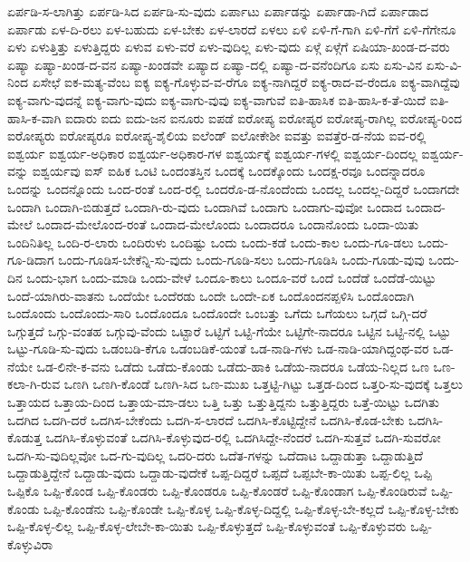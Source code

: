 {ಏರ್ಪಡಿ-ಸ-ಲಾಗಿತ್ತು
ಏರ್ಪಡಿ-ಸಿದ
ಏರ್ಪಡಿ-ಸು-ವುದು
ಏರ್ಪಾಟು
ಏರ್ಪಾಡನ್ನು
ಏರ್ಪಾಡಾ-ಗಿದೆ
ಏರ್ಪಾಡಾದ
ಏರ್ಪಾಡು
ಏಳ-ದಿ-ರಲು
ಏಳ-ಬಹುದು
ಏಳ-ಬೇಕು
ಏಳ-ಲಾರದೆ
ಏಳಲು
ಏಳಿ
ಏಳಿ-ಗೆ-ಗಾಗಿ
ಏಳಿ-ಗೆಗೆ
ಏಳಿ-ಗೆಗೇನೂ
ಏಳು
ಏಳುತ್ತಿತ್ತು
ಏಳುತ್ತಿದ್ದರು
ಏಳುವ
ಏಳು-ವರೆ
ಏಳು-ವುದಿಲ್ಲ
ಏಳು-ವುದು
ಏಳ್ಗೆ
ಏಳ್ಗೆಗೆ
ಏಷಿಯಾ-ಖಂಡ-ದ-ವರು
ಏಷ್ಯಾ
ಏಷ್ಯಾ-ಖಂಡ-ದ-ವನ
ಏಷ್ಯಾ-ಖಂಡವೇ
ಏಷ್ಯಾದ
ಏಷ್ಯಾ-ದಲ್ಲಿ
ಏಷ್ಯಾ-ದ-ವನೆಂದಿಗೂ
ಏಸು
ಏಸು-ವಿನ
ಏಸು-ವಿ-ನಿಂದ
ಏಸೇಛೆ
ಐಕ-ಮತ್ಯ-ವೆಂಬ
ಐಕ್ಯ
ಐಕ್ಯ-ಗೊಳ್ಳುವ-ವ-ರೆಗೂ
ಐಕ್ಯ-ನಾಗಿದ್ದರೆ
ಐಕ್ಯ-ರಾದ-ವ-ರೆಂದೂ
ಐಕ್ಯ-ವಾಗಿದ್ದೆವು
ಐಕ್ಯ-ವಾಗು-ವುದನ್ನೆ
ಐಕ್ಯ-ವಾಗು-ವುದು
ಐಕ್ಯ-ವಾಗು-ವುವು
ಐಕ್ಯ-ವಾಗುವೆ
ಐತಿ-ಹಾಸಿಕ
ಐತಿ-ಹಾಸಿ-ಕ-ತೆ-ಯಿದೆ
ಐತಿ-ಹಾಸಿ-ಕ-ವಾಗಿ
ಐದಾರು
ಐದು
ಐದು-ಜನ
ಐನೂರು
ಐಪಡೆ
ಐರೋಪ್ಯ
ಐರೋಪ್ಯರ
ಐರೋಪ್ಯ-ರಾಗಿಲ್ಲ
ಐರೋಪ್ಯ-ರಿಂದ
ಐರೋಪ್ಯರು
ಐರೋಪ್ಯರೂ
ಐರೋಪ್ಯ-ಶೈಲಿಯ
ಐಲೆಂಡ್
ಐಲೋಕೇಶೀ
ಐವತ್ತು
ಐವತ್ತೆರ-ಡ-ನೆಯ
ಐವ-ರಲ್ಲಿ
ಐಶ್ವರ್ಯ
ಐಶ್ವರ್ಯ-ಅಧಿಕಾರ
ಐಶ್ವರ್ಯ-ಅಧಿಕಾರ-ಗಳ
ಐಶ್ವರ್ಯಕ್ಕೆ
ಐಶ್ವರ್ಯ-ಗಳಲ್ಲಿ
ಐಶ್ವರ್ಯ-ದಿಂದಲ್ಲ
ಐಶ್ವರ್ಯ-ವನ್ನು
ಐಶ್ವರ್ಯವು
ಐಸ್
ಐಹಿಕ
ಒಂಟಿ
ಒಂದಂತಸ್ತಿನ
ಒಂದಕ್ಕೆ
ಒಂದಕ್ಕೊಂದು
ಒಂದಕ್ಷ-ರವೂ
ಒಂದನ್ನಾದರೂ
ಒಂದನ್ನು
ಒಂದನ್ನೊಂದು
ಒಂದ-ರಂತೆ
ಒಂದ-ರಲ್ಲಿ
ಒಂದರೊ-ಡ-ನೊಂದೆಂದು
ಒಂದಲ್ಲ
ಒಂದಲ್ಲ-ದಿದ್ದರೆ
ಒಂದಾಗದೇ
ಒಂದಾಗಿ
ಒಂದಾಗಿ-ಬಿಡುತ್ತದೆ
ಒಂದಾಗಿ-ರು-ವುದು
ಒಂದಾಗಿವೆ
ಒಂದಾಗು
ಒಂದಾಗು-ವುವೋ
ಒಂದಾದ
ಒಂದಾದ-ಮೇಲೆ
ಒಂದಾದ-ಮೇಲೊಂದ-ರಂತೆ
ಒಂದಾದ-ಮೇಲೊಂದು
ಒಂದಾದರೂ
ಒಂದಾನೊಂದು
ಒಂದಾ-ಯಿತು
ಒಂದಿನಿತಿಲ್ಲ
ಒಂದಿ-ರ-ಲಾರು
ಒಂದಿರುಳು
ಒಂದಿಷ್ಟು
ಒಂದು
ಒಂದು-ಕಡೆ
ಒಂದು-ಕಾಲ
ಒಂದು-ಗೂ-ಡಲು
ಒಂದು-ಗೂ-ಡಿದಾಗ
ಒಂದು-ಗೂಡಿಸ-ಬೇಕೆನ್ನಿ-ಸು-ವುದು
ಒಂದು-ಗೂಡಿ-ಸಲು
ಒಂದು-ಗೂಡಿಸಿ
ಒಂದು-ಗೂಡು-ವುವು
ಒಂದು-ದಿನ
ಒಂದು-ಭಾಗ
ಒಂದು-ಮಾಡಿ
ಒಂದು-ವೇಳೆ
ಒಂದೂ-ಕಾಲು
ಒಂದೂ-ವರೆ
ಒಂದೆ
ಒಂದೆಡೆ
ಒಂದೆಡೆ-ಯಿಟ್ಟು
ಒಂದೆ-ಯಾಗಿರು-ವಾತನು
ಒಂದೆಯೇ
ಒಂದೆರಡು
ಒಂದೇ
ಒಂದೇ-ಏಕ
ಒಂದೊಂದನಪ್ಪಳಿಸಿ
ಒಂದೊಂದಾಗಿ
ಒಂದೊಂದು
ಒಂದೊಂದು-ಸಾರಿ
ಒಂದೊಂದೂ
ಒಂದೊಂದೇ
ಒಂಬತ್ತು
ಒಗೆದು
ಒಗೆಯಲು
ಒಗ್ಗದೆ
ಒಗ್ಗಿ-ದರೆ
ಒಗ್ಗುತ್ತದೆ
ಒಗ್ಗು-ವಂತಹ
ಒಗ್ಗುವು-ವೆಂದು
ಒಟ್ಟಾರೆ
ಒಟ್ಟಿಗೆ
ಒಟ್ಟಿ-ಗೆಯೇ
ಒಟ್ಟಿಗೇ-ನಾದರೂ
ಒಟ್ಟಿನ
ಒಟ್ಟಿ-ನಲ್ಲಿ
ಒಟ್ಟು
ಒಟ್ಟು-ಗೂಡಿ-ಸು-ವುದು
ಒಡಂಬಡಿ-ಕೆಗೂ
ಒಡಂಬಡಿಕೆ-ಯಂತೆ
ಒಡ-ನಾಡಿ-ಗಳು
ಒಡ-ನಾಡಿ-ಯಾಗಿದ್ದಂಥ-ವರ
ಒಡ-ನೆಯೇ
ಒಡ-ಲಿನೇ-ಕ-ವನು
ಒಡೆದು
ಒಡೆದು-ಕೊಂಡು
ಒಡೆದು-ಹಾಕಿ
ಒಡೆಯ-ನಾದರೂ
ಒಡೆಯ-ನಿಲ್ಲದ
ಒಣ
ಒಣ-ಕಲಾ-ಗಿ-ರುವ
ಒಣಗಿ
ಒಣಗಿ-ಕೊಂಡೆ
ಒಣಗಿ-ಸಿದ
ಒಣ-ಮುಖ
ಒತ್ತಟ್ಟಿ-ಗಿಟ್ಟು
ಒತ್ತಡ-ದಿಂದ
ಒತ್ತರಿ-ಸು-ವುದಕ್ಕೆ
ಒತ್ತಲು
ಒತ್ತಾಯದ
ಒತ್ತಾಯ-ದಿಂದ
ಒತ್ತಾಯ-ಮಾ-ಡಲು
ಒತ್ತಿ
ಒತ್ತು
ಒತ್ತುತ್ತಿದ್ದನು
ಒತ್ತುತ್ತಿದ್ದರು
ಒತ್ತೆ-ಯಿಟ್ಟು
ಒದಗಿತು
ಒದಗಿದ
ಒದಗಿ-ದರೆ
ಒದಗಿಸ-ಬೇಕೆಂದು
ಒದಗಿ-ಸ-ಲಾರದೆ
ಒದಗಿಸಿ-ಕೊಟ್ಟಿದ್ದೇನೆ
ಒದಗಿಸಿ-ಕೊಡ-ಬೇಕು
ಒದಗಿಸಿ-ಕೊಡುತ್ತ
ಒದಗಿಸಿ-ಕೊಳ್ಳುವಂತೆ
ಒದಗಿಸಿ-ಕೊಳ್ಳುವುದ-ರಲ್ಲಿ
ಒದಗಿಸಿದ್ದೇ-ನೆಂದರೆ
ಒದಗಿ-ಸುತ್ತವೆ
ಒದಗಿ-ಸುವರೋ
ಒದಗಿ-ಸು-ವುದಿಲ್ಲವೋ
ಒದ-ಗು-ವುದಿಲ್ಲ
ಒದರಿ-ದರು
ಒದೆತ-ಗಳನ್ನು
ಒದೆದಾಟ
ಒದ್ದಾಡುತ್ತಾ
ಒದ್ದಾಡುತ್ತಿದೆ
ಒದ್ದಾಡುತ್ತಿದ್ದೇನೆ
ಒದ್ದಾಡು-ವುದು
ಒದ್ದಾಡು-ವುದೇಕೆ
ಒಪ್ಪ-ದಿದ್ದರೆ
ಒಪ್ಪದೆ
ಒಪ್ಪಬೇ-ಕಾ-ಯಿತು
ಒಪ್ಪ-ಲಿಲ್ಲ
ಒಪ್ಪಿ
ಒಪ್ಪಿಕೊ
ಒಪ್ಪಿ-ಕೊಂಡ
ಒಪ್ಪಿ-ಕೊಂಡರು
ಒಪ್ಪಿ-ಕೊಂಡರೂ
ಒಪ್ಪಿ-ಕೊಂಡರೆ
ಒಪ್ಪಿ-ಕೊಂಡಾಗ
ಒಪ್ಪಿ-ಕೊಂಡಿರುವೆ
ಒಪ್ಪಿ-ಕೊಂಡು
ಒಪ್ಪಿ-ಕೊಂಡೆನು
ಒಪ್ಪಿ-ಕೊಂಡೇ
ಒಪ್ಪಿ-ಕೊಳ್ಳ
ಒಪ್ಪಿ-ಕೊಳ್ಳ-ದಿದ್ದಲ್ಲಿ
ಒಪ್ಪಿ-ಕೊಳ್ಳ-ಬೇ-ಕಲ್ಲದೆ
ಒಪ್ಪಿ-ಕೊಳ್ಳ-ಬೇಕು
ಒಪ್ಪಿ-ಕೊಳ್ಳ-ಲಿಲ್ಲ
ಒಪ್ಪಿ-ಕೊಳ್ಳ-ಲೇಬೇ-ಕಾ-ಯಿತು
ಒಪ್ಪಿ-ಕೊಳ್ಳುತ್ತದೆ
ಒಪ್ಪಿ-ಕೊಳ್ಳುವಂತೆ
ಒಪ್ಪಿ-ಕೊಳ್ಳುವರು
ಒಪ್ಪಿ-ಕೊಳ್ಳುವಿರಾ
}

